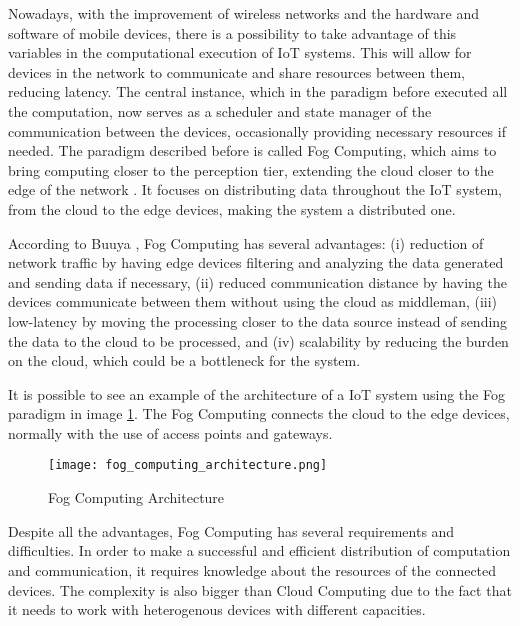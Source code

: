 Nowadays, with the improvement of wireless networks and the hardware and software of mobile devices, there is a possibility to take advantage of this variables in the computational execution of IoT systems. This will allow for devices in the network to communicate and share resources between them, reducing latency. The central instance, which in the paradigm before executed all the computation, now serves as a scheduler and state manager of the communication between the devices, occasionally providing necessary resources if needed. The paradigm described before is called Fog Computing, which aims to bring computing closer to the perception tier, extending the cloud closer to the edge of the network \cite{mobile_cloud}. It focuses on distributing data throughout the IoT system, from the cloud to the edge devices, making the system a distributed one.
\par According to Buuya \cite{IoT_principles_and_paradigms}, Fog Computing has several advantages: (i) reduction of network traffic by having edge devices filtering and analyzing the data generated and sending data if necessary, (ii) reduced communication distance by having the devices communicate between them without using the cloud as middleman, (iii) low-latency by moving the processing closer to the data source instead of sending the data to the cloud to be processed, and (iv) scalability by reducing the burden on the cloud, which could be a bottleneck for the system.
\par It is possible to see an example of the architecture of a IoT system using the Fog paradigm in image \ref{fig:fog_architecture}. The Fog Computing connects the cloud to the edge devices, normally with the use of access points and gateways. 

\begin{figure}[h]
\caption{Fog Computing Architecture \cite{IoT_principles_and_paradigms}}
\label{fig:fog_architecture}
\centering
\texttt{[image: fog\_computing\_architecture.png]}
\end{figure}

\par Despite all the advantages, Fog Computing has several requirements and difficulties. In order to make a successful and efficient distribution of computation and communication, it requires knowledge about the resources of the connected devices. The complexity is also bigger than Cloud Computing due to the fact that it needs to work with heterogenous devices with different capacities. 
       
